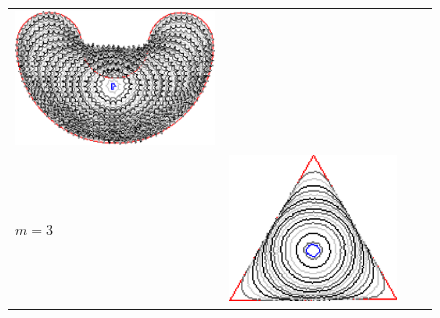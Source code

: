 \begin{figure}
\begin{tabular}{p{3em}ccc}
\includegraphics[scale=0.25]{figures/chapter6/level-effect/bean/improve/len_pen0/radius-5/level1/summary.pdf} \\[2em]
$m=3$ & \includegraphics[scale=0.25]{figures/chapter6/level-effect/triangle/improve/len_pen0/radius-5/level3/summary.pdf} &

\end{tabular}
\end{figure}
